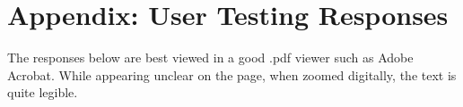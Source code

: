 \newpage
\section{Appendix: User Testing Responses}\label{sec:appendix:-user-testing-responses}
The responses below are best viewed in a good .pdf viewer such as Adobe Acrobat.
While appearing unclear on the page, when zoomed digitally, the text is quite legible.

